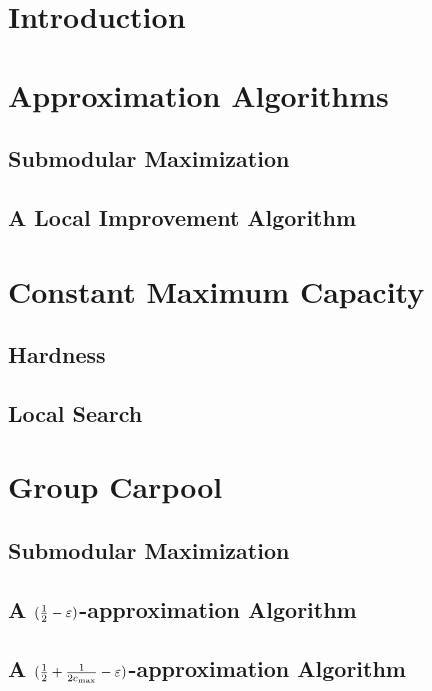 \begin{abstract}

\end{abstract}

\section{Introduction}


\section{Approximation Algorithms}
\label{sec:approx}


\subsection{Submodular Maximization}
\label{sec:sub}


   \subsection{A Local Improvement Algorithm}
   \label{sec:improve}
   

\section{Constant Maximum Capacity}
\label{sec:cmax}


   \subsection{Hardness}
   \label{sec:hardness}
   

   \subsection{Local Search}
   \label{sec:local}
   

\section{Group Carpool}
\label{sec:group}


   \subsection{Submodular Maximization}
   

   \subsection{A \texorpdfstring{$(\frac{1}{2} - \varepsilon)$}--approximation
	Algorithm}
   

   \subsection{A \texorpdfstring{$(\frac{1}{2} + \frac{1}{2c_{\max}} - \varepsilon)$}--approximation
	Algorithm}
   
